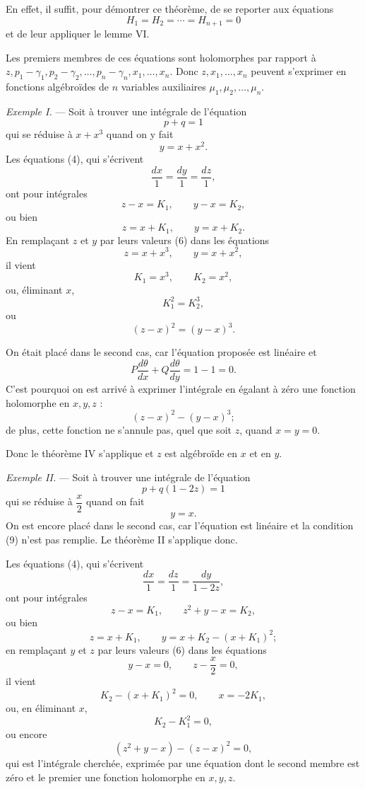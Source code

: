 \documentclass[11pt]{article}
\begin{document}
En effet, il suffit, pour démontrer ce théorème, de se reporter aux équations
\[
H_1=H_2=\cdots=H_{n+1}=0
\]
et de leur appliquer le lemme VI.

Les premiers membres de ces équations sont holomorphes par rapport à $z,p_1-\gamma_1,p_2-\gamma_2,\ldots,p_n-\gamma_n,x_1,\ldots,x_n$. Donc $z,x_1,\ldots,x_n$ peuvent s’exprimer en fonctions algébroïdes de $n$ variables auxiliaires $\mu_1,\mu_2,\ldots,\mu_n$.

\emph{Exemple I.} — Soit à trouver une intégrale de l’équation
\[
p+q=1
\]
qui se réduise à $x+x^3$ quand on y fait
\[
y=x+x^2.
\]
Les équations (4), qui s’écrivent
\[
\frac{dx}{1}=\frac{dy}{1}=\frac{dz}{1},
\]
ont pour intégrales
\begin{equation*}\tag{5}
z-x=K_1,
\qquad y-x=K_2,
\end{equation*}
ou bien
\begin{equation*}\tag{6}
z=x+K_1,
\qquad y=x+K_2.
\end{equation*}
En remplaçant $z$ et $y$ par leurs valeurs (6) dans les équations
\[
z=x+x^3,
\qquad y=x+x^2,
\]
il vient
\[
K_1=x^3,
\qquad K_2=x^2,
\]
ou, éliminant $x$,
\[
K_1^2=K_2^3,
\]
ou
\[
(z-x)^2=(y-x)^3.
\]

On était placé dans le second cas, car l’équation proposée est linéaire et
\[
P\frac{d\theta}{dx}+Q\frac{d\theta}{dy}=1-1=0.
\]
C’est pourquoi on est arrivé à exprimer l’intégrale en égalant à zéro une fonction holomorphe en $x,y,z$ :
\[
(z-x)^2-(y-x)^3;
\]
de plus, cette fonction ne s’annule pas, quel que soit $z$, quand $x=y=0$.

Donc le théorème IV s’applique et $z$ est algébroïde en $x$ et en $y$.

\emph{Exemple II.} — Soit à trouver une intégrale de l’équation
\[
p+q(1-2z)=1
\]
qui se réduise à $\dfrac{x}{2}$ quand on fait
\[
y=x.
\]
On est encore placé dans le second cas, car l’équation est linéaire et la condition (9) n’est pas remplie. Le théorème II s’applique donc.

Les équations (4), qui s’écrivent
\[
\frac{dx}{1}=\frac{dz}{1}=\frac{dy}{1-2z},
\]
ont pour intégrales
\begin{equation*}\tag{5}
z-x=K_1,
\qquad z^2+y-x=K_2,
\end{equation*}
ou bien
\begin{equation*}\tag{6}
z=x+K_1,
\qquad y=x+K_2-(x+K_1)^2;
\end{equation*}
en remplaçant $y$ et $z$ par leurs valeurs (6) dans les équations
\[
y-x=0,
\qquad z-\frac{x}{2}=0,
\]
il vient
\[
K_2-(x+K_1)^2=0,
\qquad x=-2K_1,
\]
ou, en éliminant $x$,
\[
K_2-K_1^2=0,
\]
ou encore
\begin{equation*}\tag{12}
(z^2+y-x)-(z-x)^2=0,
\end{equation*}
qui est l’intégrale cherchée, exprimée par une équation dont le second membre est zéro et le premier une fonction holomorphe en $x,y,z$.
\end{document}
